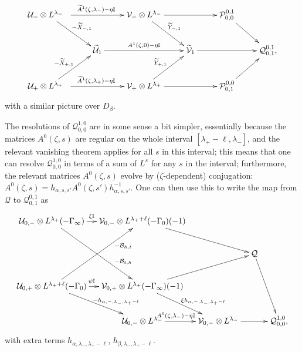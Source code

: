 \documentclass[12pt]{article}
\theoremstyle{definition}
\theoremstyle{remark}
\numberwithin{theorem}{section}
\def\bI{{\mathbb {I}}}
\def\pB{{\mathcal B}}
\def\pP{{\mathcal P}}
\def\pQ{{\mathcal Q}}
\def\pU{{\mathcal U}}
\def\pV{{\mathcal V}}
\begin{document}
         \begin{equation}  \xymatrix{  
   \pU_{-}\otimes L^{\lambda_-}\ \ \ar[dr]^{-\widetilde X_{ -,1}  } \ar[rr]^{\widetilde A^1(\zeta,\lambda_-)-\eta\bI} &&  \pV_{-}\otimes L^{\lambda_-}\ar[dr]^{\widetilde Y_{-,1}} \ar[rr]  &&\pP_{0,0}^{0,1}\ar[dr] \\      
        & \widetilde \pU_{1}  \ar[rr]^{  A^1(\zeta,0)-\eta\bI} &&\widetilde \pV_{1} \ar[rr]  &&\pQ_{0,1}^{0,1}, \\
\pU_{+}\otimes L^{\lambda_+}\ \ \ar[ur]^{ -\widetilde X_{ +,1}  } \ar[rr]^{\widetilde A^1(\zeta,\lambda_+)-\eta\bI} && \pV_{+}\otimes L^{\lambda_+}\ar[ur]^{ \widetilde Y_{+,1}} \ar[rr]  &&\pP^{0,0}_{0,1}  \ar[ur]}\end{equation}
with a similar picture over $D_\beta.$

The resolutions of    $\pQ^{1,0}_{0,0}$ are in some sense a bit simpler, essentially because the matrices $A^0(\zeta,s)$ are regular on the whole interval $[\lambda_+-\ell, \lambda_-]$, and the relevant vanishing theorem applies for all $s$ in this interval; this means that one can resolve  $\pQ^{1,0}_{0,0}$ in terms of a sum of $L^s$ for any $s$ in the interval; furthermore, the relevant matrices $A^0(\zeta,s)$ evolve by ($\zeta$-dependent) conjugation:  $A^0(\zeta,s) =  h_{\alpha, s, s'}A^0(\zeta,s') h_{\alpha, s, s'}^{-1}$. One can then use this to write  the map from $\pQ$ to $\pQ^{0,1}_{0,1}$   as
  \begin{equation} 
  \xymatrix@C=0.9em{  
\pU_{0,-}\otimes L^{\lambda_+}(-\Gamma_\infty)    \ar[ddr]^(0.7){- \pB_{t,h}}\ar[r]^(0.44){\xi\bI} &  \pV_{0,-}\otimes L^{\lambda_++\ell} (-\Gamma_0 ) (-1)    \ar[drr] \\ 
 &&&\pQ \ar[ddr] \\
  \pU_{0,+}\otimes L^{\lambda_++\ell }( -\Gamma_0) \ar[dr]^(0.6){-h_{\alpha,-,\lambda_-,\lambda_+-\ell} }  \ar[uur]_(0.7){ -  \pB_{h,t}}\ar[r]^(0.44){\psi\bI} &  \pV_{0,+}\otimes L^{\lambda_+}(-\Gamma_\infty )  (-1)\ar[dr]^(0.6){\ \ \xi h_{\alpha,-,\lambda_-,\lambda_+-\ell}} \ar[rru]  \\
  & \pU_{0,-}\otimes L^{\lambda_-}\ar[r]^(0.44){A^0(\zeta,\lambda_-)-\eta\bI}  &\pV_{0,-}\otimes L^{\lambda_-} \ar[rr]  &&\pQ_{0 ,0}^{ 1,0},
  }
\end{equation}
with extra terms
$h_{\alpha, \lambda_-, \lambda_+-\ell}$, $h_{\beta, \lambda_-, \lambda_+-\ell}$.
\end{document}

